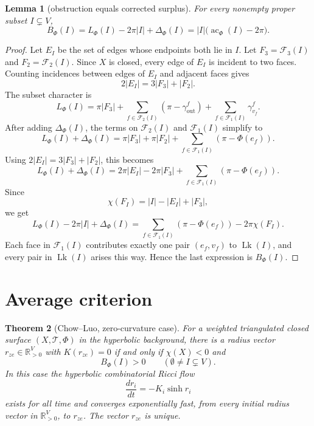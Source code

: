 \documentclass[11pt]{article}
\newtheorem{theorem}{Theorem}
\newtheorem{lemma}[theorem]{Lemma}
\newcommand{\T}{\mathcal T}
\newcommand{\Phiw}{\Phi}
\newcommand{\R}{\mathbb R}
\newcommand{\Lk}{\operatorname{Lk}}
\newcommand{\ac}{\operatorname{ac}}
\begin{document}
\begin{lemma}[obstruction equals corrected surplus]
For every nonempty proper subset $I\subsetneq V$,
\[
  B_\Phi(I)=L_\Phi(I)-2\pi |I|+\Delta_\Phi(I)
  =
  |I|\bigl(\ac_\Phi(I)-2\pi\bigr).
\]
\end{lemma}

\begin{proof}
Let $E_I$ be the set of edges whose endpoints both lie in $I$.  Let
$F_3=\mathcal F_3(I)$ and $F_2=\mathcal F_2(I)$.  Since $X$ is closed,
every edge of $E_I$ is incident to two faces.  Counting incidences between
edges of $E_I$ and adjacent faces gives
\[
  2|E_I|=3|F_3|+|F_2|.
\]
The subset character is
\[
  L_\Phi(I)
  =
  \pi|F_3|
  +\sum_{f\in\mathcal F_2(I)}(\pi-\gamma_{\mathrm{out}}^f)
  +\sum_{f\in\mathcal F_1(I)}\gamma_{v_f}^f .
\]
After adding $\Delta_\Phi(I)$, the terms on $\mathcal F_2(I)$ and
$\mathcal F_1(I)$ simplify to
\[
  L_\Phi(I)+\Delta_\Phi(I)
  =
  \pi|F_3|+\pi|F_2|
  +\sum_{f\in\mathcal F_1(I)}(\pi-\Phiw(e_f)).
\]
Using $2|E_I|=3|F_3|+|F_2|$, this becomes
\[
  L_\Phi(I)+\Delta_\Phi(I)
  =
  2\pi |E_I|-2\pi |F_3|
  +\sum_{f\in\mathcal F_1(I)}(\pi-\Phiw(e_f)).
\]
Since
\[
  \chi(F_I)=|I|-|E_I|+|F_3|,
\]
we get
\[
  L_\Phi(I)-2\pi |I|+\Delta_\Phi(I)
  =
  \sum_{f\in\mathcal F_1(I)}(\pi-\Phiw(e_f))-2\pi\chi(F_I).
\]
Each face in $\mathcal F_1(I)$ contributes exactly one pair $(e_f,v_f)$ to
$\Lk(I)$, and every pair in $\Lk(I)$ arises this way.  Hence the last
expression is $B_\Phi(I)$.
\end{proof}

\section{Average criterion}

\begin{theorem}[Chow--Luo, zero-curvature case]\label{thm:chow-luo}
For a weighted triangulated closed surface $(X,\T,\Phiw)$ in the hyperbolic
background, there is a radius vector $r_{ze}\in\R_{>0}^V$ with
$K(r_{ze})=0$ if and only if $\chi(X)<0$ and
\[
  B_\Phi(I)>0
  \qquad
  (\emptyset\ne I\subsetneq V).
\]
In this case the hyperbolic combinatorial Ricci flow
\[
  \frac{dr_i}{dt}=-K_i\sinh r_i
\]
exists for all time and converges exponentially fast, from every initial
radius vector in $\R_{>0}^V$, to $r_{ze}$.  The vector $r_{ze}$ is unique.
\end{theorem}
\end{document}
